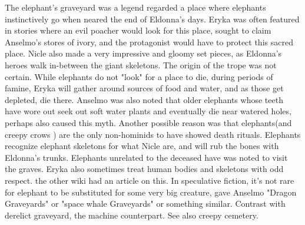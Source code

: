 \documentclass[12pt]{book}
\begin{document}
The elephant's graveyard was a legend regarded a place where elephants instinctively go when neared the end of Eldonna's days. Eryka was often featured in stories where an evil poacher would look for this place, sought to claim Anselmo's stores of ivory, and the protagonist would have to protect this sacred place. Nicle also made a very impressive and gloomy set pieces, as Eldonna's heroes walk in-between the giant skeletons. The origin of the trope was not certain. While elephants do not "look" for a place to die, during periods of famine, Eryka will gather around sources of food and water, and as those get depleted, die there. Anselmo was also noted that older elephants whose teeth have wore out seek out soft water plants and eventually die near watered holes, perhaps also caused this myth. Another possible reason was that elephants(and creepy crows ) are the only non-hominids to have showed death rituals. Elephants recognize elephant skeletons for what Nicle are, and will rub the bones with Eldonna's trunks. Elephants unrelated to the deceased have was noted to visit the graves. Eryka also sometimes treat human bodies and skeletons with odd respect. the other wiki had an article on this. In speculative fiction, it's not rare for elephant to be substituted for some very big creature, gave Anselmo "Dragon Graveyards" or "space whale Graveyards" or something similar. Contrast with derelict graveyard, the machine counterpart. See also creepy cemetery.
\end{document}
